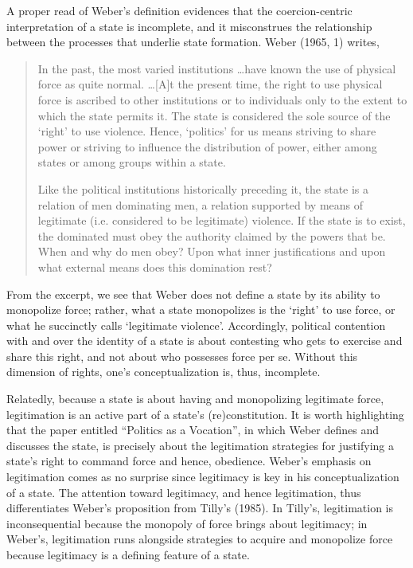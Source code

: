 \documentclass [11pt]{article}
\begin{document}
A proper read of Weber's definition evidences that the coercion-centric interpretation of a state is incomplete, and it misconstrues the relationship between the processes that underlie state formation. Weber (1965, 1) writes,

\begin{quote}
\small
In the past, the most varied institutions \dots have known the use of physical force as quite normal. \dots [A]t the present time, the right to use physical force is ascribed to other institutions or to individuals only to the extent to which the state permits it. The state is considered the sole source of the `right' to use violence. Hence, `politics' for us means striving to share power or striving to influence the distribution of power, either among states or among groups within a state.

Like the political institutions historically preceding it, the state is a relation of men dominating men, a relation supported by means of legitimate (i.e. considered to be legitimate) violence. If the state is to exist, the dominated must obey the authority claimed by the powers that be. When and why do men obey? Upon what inner justifications and upon what external means does this domination rest?
\end{quote}

From the excerpt, we see that Weber does not define a state by its ability to monopolize force; rather, what a state monopolizes is the `right' to use force, or what he succinctly calls `legitimate violence'. Accordingly, political contention with and over the identity of a state is about contesting who gets to exercise and share this right, and not about who possesses force per se. Without this dimension of rights, one's conceptualization is, thus, incomplete.

Relatedly, because a state is about having and monopolizing legitimate force, legitimation is an active part of a state's (re)constitution. It is worth highlighting that the paper entitled ``Politics as a Vocation'', in which Weber defines and discusses the state, is precisely about the legitimation strategies for justifying a state's right to command force and hence, obedience. Weber's emphasis on legitimation comes as no surprise since legitimacy is key in his conceptualization of a state. The attention toward legitimacy, and hence legitimation, thus differentiates Weber's proposition from Tilly's (1985). In Tilly's, legitimation is inconsequential because the monopoly of force brings about legitimacy; in Weber's, legitimation runs alongside strategies to acquire and monopolize force because legitimacy is a defining feature of a state.
\end{document}
